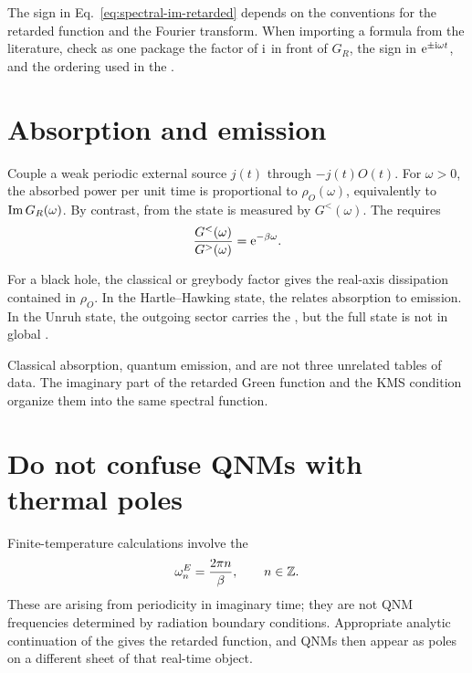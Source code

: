 \begin{warningbox}
The sign in Eq.~\eqref{eq:spectral-im-retarded} depends on the conventions for the retarded function and the Fourier transform. When importing a formula from the literature, check as one package the factor of $\mathrm{i}$ in front of $G_R$, the sign in $\mathrm{e}^{\pm\mathrm{i}\omega t}$, and the ordering used in the .
\end{warningbox}

\section{Absorption and emission}

Couple a weak periodic external source $j(t)$ through $-j(t)O(t)$. For $\omega>0$, the absorbed power per unit time is proportional to $\rho_O(\omega)$, equivalently to $\operatorname{Im} G_R(\omega)$. By contrast,  from the state is measured by $G^<(\omega)$. The  requires
\begin{equation}
\frac{G^<(\omega)}{G^>(\omega)}
=
\mathrm{e}^{-\beta\omega}.
\label{eq:detailed-balance-ratio}
\end{equation}

For a black hole, the classical  or greybody factor gives the real-axis dissipation contained in $\rho_O$. In the Hartle--Hawking state, the  relates absorption to emission. In the Unruh state, the outgoing sector carries the , but the full state is not in global .

\begin{principlebox}
Classical absorption, quantum emission, and  are not three unrelated tables of data. The imaginary part of the retarded Green function and the KMS condition organize them into the same spectral function.
\end{principlebox}

\section{Do not confuse QNMs with thermal poles}

Finite-temperature calculations involve the 
\begin{equation}
\omega_n^{E}
=
\frac{2\pi n}{\beta},
\qquad
n\in\mathbb{Z}.
\label{eq:bosonic-matsubara}
\end{equation}
These are  arising from periodicity in imaginary time; they are not QNM frequencies determined by radiation boundary conditions. Appropriate analytic continuation of the  gives the retarded function, and QNMs then appear as poles on a different sheet of that real-time object.

